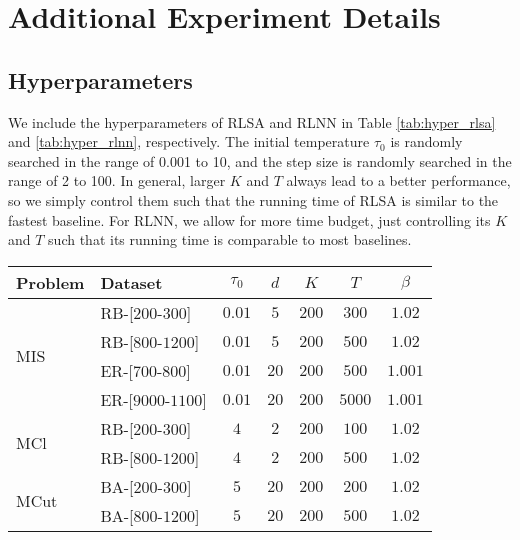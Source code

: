 \section{Additional Experiment Details}
\label{sec:detail}
\subsection{Hyperparameters}
We include the hyperparameters of RLSA and RLNN in Table \ref{tab:hyper_rlsa} and \ref{tab:hyper_rlnn}, respectively. The initial temperature $\tau_0$ is randomly searched in the range of 0.001 to 10, and the step size is randomly searched in the range of 2 to 100. In general, larger $K$ and $T$ always lead to a better performance, so we simply control them such that the running time of RLSA is similar to the fastest baseline. For RLNN, we allow for more time budget, just controlling its $K$ and $T$ such that its running time is comparable to most baselines.

\begin{table*}[h!]
    \centering
        \caption{Hyperparameters used by RLSA on all datasets.}
    \begin{tabular}{ll|ccccc}
    \toprule
    Problem & Dataset & $\tau_0$ & $d$ & $K$ & $T$ & $\beta$\\
    \midrule 
     \multirow{4}{*}{MIS} & RB-[$200$-$300$] & $0.01$ & $5$  & $200$ & $300$ & $1.02$ \\
         &  RB-[$800$-$1200$]& $0.01$ & $5$  & $200$ & $500$  & $1.02$  \\
         &  ER-[$700$-$800$] & $0.01$ & $20$  & $200$ & $500$ & $1.001$\\
         & ER-[$9000$-$1100$]& $0.01$ & $20$   & $200$ & $5000$ & $1.001$\\
         \midrule
     \multirow{2}{*}{MCl} & RB-[$200$-$300$] & $4$ & $2$ & $200$ & $100$  & $1.02$ \\
     &  RB-[$800$-$1200$]& $4$ & $2$ & $200$ & $500$  & $1.02$ \\
     \midrule
     \multirow{2}{*}{MCut} & BA-[$200$-$300$] & $5$ & $20$ & $200$ & $200$  & $1.02$ \\
     &  BA-[$800$-$1200$] & $5$  & $20$ & $200$ & $500$  & $1.02$ \\
    \bottomrule     
    \end{tabular}
    \label{tab:hyper_rlsa}
\end{table*}

